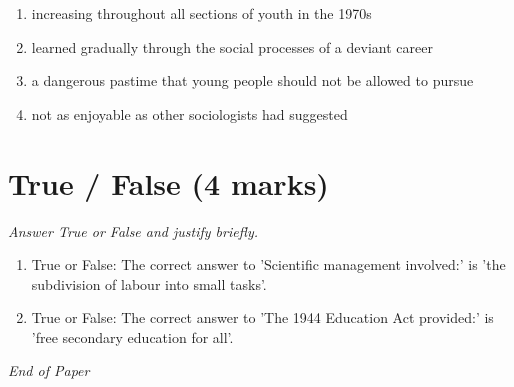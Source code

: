 \documentclass[12pt]{article}
\begin{document}
\begin{enumerate}[label=\arabic*.]
\begin{enumerate}[label=(\alph*)]
    \item increasing throughout all sections of youth in the 1970s
    \item learned gradually through the social processes of a deviant career
    \item a dangerous pastime that young people should not be allowed to pursue
    \item not as enjoyable as other sociologists had suggested
\end{enumerate}
\end{enumerate}

\section*{True / False (4 marks)}
\textit{Answer True or False and justify briefly.}
\begin{enumerate}[label=\arabic*.]
\item True or False: The correct answer to 'Scientific management involved:' is 'the subdivision of labour into small tasks'.
\item True or False: The correct answer to 'The 1944 Education Act provided:' is 'free secondary education for all'.
\end{enumerate}

\vfill
\noindent\textit{End of Paper}
\end{document}
